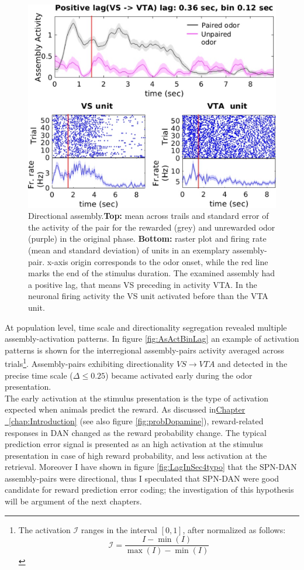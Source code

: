 \begin{figure}
    \centering
    \includegraphics[scale=0.6]{figures/DirectionalAsEx1.pdf}
    \caption{Directional assembly.\textbf{Top:} mean across trails and standard error of the activity of the pair for the rewarded (grey) and unrewarded odor (purple) in the original phase. \textbf{Bottom:} raster plot and firing rate (mean and standard deviation) of units in an exemplary assembly-pair. x-axis origin corresponds to the odor onset, while the red line marks the end of the stimulus duration. The examined assembly had a positive lag, that means VS preceding in activity VTA. In the neuronal firing activity the VS unit activated before than the VTA unit.}
    \label{fig:directional_assembly}
\end{figure}
At population level, time scale and directionality segregation revealed multiple assembly-activation patterns. In figure \ref{fig:AsActBinLag} an example of activation patterns is shown for the interregional assembly-pairs activity averaged across trials\footnote{The activation $\mathcal{I}$ ranges in the interval $[0,1]$, after normalized as follows:
\begin{equation}
    \mathcal{I} = \frac{I-\min(I)}{\max(I)-\min(I)}
    \label{eq:norm}
\end{equation}}. 
Assembly-pairs exhibiting directionality $VS \rightarrow VTA$ and detected in the precise time scale ($\Delta \le 0.25$) became activated early during the odor presentation.\\The early activation at the stimulus presentation is the type of activation expected when animals predict the reward. As discussed in\hyperref[chap:Introduction]{Chapter ~\ref*{chap:Introduction}} (see also figure \ref{fig:probDopamine}), reward-related responses in DAN changed as the reward probability change. The typical prediction error signal is presented as an high activation at the stimulus presentation in case of high reward probability, and less activation at the retrieval. Moreover I have shown in figure \ref{fig:LagInSec4typo} that the SPN-DAN assembly-pairs were directional, thus I speculated that SPN-DAN were good candidate for reward prediction error coding; the investigation of this hypothesis will be argument of the next chapters.\\
